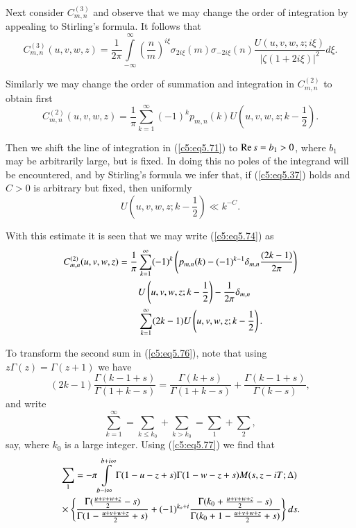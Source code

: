Next consider $C^{(3)}_{m,n}$ and observe that we may change the order
of integration by appealing to Stirling's formula. It follows that  
{\fontsize{10pt}{12pt}\selectfont
\begin{equation}
C^{(3)}_{m,n} (u,v,w,z) = \frac{1}{2\pi}
\int\limits^{\infty}_{-\infty} \left(\frac{n}{m} \right)^{i\xi}
\sigma_{2i\xi} (m) \sigma_{-2i\xi} (n) \frac{U(u,v,w,z; i
  \xi)}{|\zeta(1+2i\xi)|^2} d \xi.\label{c5:eq5.73} 
\end{equation}}

Similarly we may change the order of summation and integration in
$C^{(2)}_{m,n}$ to obtain first 
\begin{equation}
C^{(2)}_{m,n} (u,v,w,z) = \frac{1}{\pi} \sum\limits^{\infty}_{k=1}
(-1)^k p_{m,n} (k) U \left(u,v,w,z; k -\frac{1}{2}
\right).\label{c5:eq5.74} 
\end{equation}

Then we shift the line of integration in (\ref{c5:eq5.71}) to $\operatorname{Re} s =
b_1 > 0$, where $b_1$ may be arbitrarily large, but is fixed. In doing
this no poles of the integrand will be encountered, and by Stirling's
formula we infer that, if (\ref{c5:eq5.37}) holds and $C>0$ is
arbitrary but fixed, then uniformly 
\begin{equation}
U \left(u,v,w,z;k-\frac{1}{2} \right) \ll k^{-C}.\label{c5:eq5.75}
\end{equation}

With this estimate it is seen that we may write (\ref{c5:eq5.74}) as
\begin{align}
C^{(2)}_{m,n} (u,v,w,z) & = \frac{1}{\pi}
\sum\limits^{\infty}_{k=1}(-1)^k \left(p_{m,n} (k) - (-1)^{k-1}
\delta_{m,n} \frac{(2k-1)}{2\pi} \right)\notag\\  
& \qquad U \left(u,v,w,z;k -\frac{1}{2} \right) - \frac{1}{2\pi}
\delta_{m,n}\notag\\ 
& \qquad  \sum\limits^\infty_{k=1} (2k-1) U
\left(u,v,w,z;k-\frac{1}{2} \right).\label{c5:eq5.76} 
\end{align}

To transform the second sum in (\ref{c5:eq5.76}), note that using
$z\Gamma(z) = \Gamma (z+1)$ we have  
\begin{equation}
(2k-1) \frac{\Gamma (k-1 +s)}{\Gamma (1+k-s)} = \frac{\Gamma
    (k+s)}{\Gamma(1+k-s)} + \frac{\Gamma(k-1+s)}{\Gamma(k-s)},
  \label{c5:eq5.77} 
\end{equation}
and write
$$
\sum\limits^\infty_{k=1} = \sum\limits_{k \leq k_0} + \sum\limits_{k >
  k_0} = \sum\limits_1 + \sum\limits_{2},  
$$
say, where $k_0$ is a large integer. Using (\ref{c5:eq5.77}) we find
that  
\begin{align}
& \sum_1 = - \pi \int\limits^{b + i \infty}_{b - i \infty} \Gamma
  (1-u-z+s) \Gamma (1-w-z+s) M (s, z-iT;\Delta) \label{c5:eq5.78}\\ 
& \times \left\{  \frac{\Gamma (\frac{u + v+w+z}{2} -s)}{\Gamma (1-
    \frac{u+v+w+z}{2} +s)} + (-1)^{k_o+i} \frac{\Gamma (k_0 +
    \frac{u+v+w+z}{2} -s)}{\Gamma(k_0 + 1 - \frac{u+v+w+z}{2} + s)}
  \right\} ds.\notag 
\end{align}\pageoriginale

